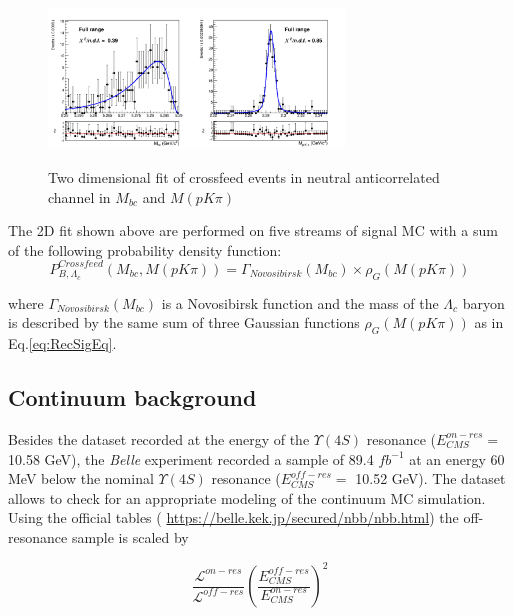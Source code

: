 \begin{figure}
\centering
{\includegraphics[width=0.7\textwidth]{04-SimultaneousFit/figs/stream12345_Crossfeed_neutral_anticorrLambdaC_2Dfit.png}}
\caption{Two dimensional fit of crossfeed events in neutral anticorrelated channel in $M_{bc}$  and $M(p K \pi)$ }
\label{fig:stream12345_Crossfeed_neutral_anticorrLambdaC_2Dfit}
\end{figure}

\newpage
The 2D fit shown above are  performed on five streams of signal MC with a sum of the following probability density function:
\vspace{0.2 cm}
 \begin{equation}
        P^{Crossfeed}_{B,\Lambda_c}(M_{bc}, M(p K \pi)) = \Gamma_{Novosibirsk}(M_{bc}) \times \rho_G(M(p K \pi))
\end{equation} 

where $\Gamma_{Novosibirsk}(M_{bc})$ is a Novosibirsk function and the mass of the $\Lambda_c$ baryon is described by the same sum of three Gaussian functions $\rho_G(M(p K \pi))$ as in Eq.\ref{eq:RecSigEq}.

\subsection{Continuum background}


 Besides the dataset recorded at the energy of the $\Upsilon(4S) $ resonance  ($E^{on-res}
_{CMS} = $ 10.58 GeV), the \textit{Belle} experiment recorded a sample of 89.4 $fb^{-1}$ at an energy 60 MeV below the nominal  $\Upsilon(4S) $ resonance ($E^{off-res}_{CMS} = $ 10.52 GeV). The dataset allows to check for an appropriate modeling of the continuum MC simulation. %
Using the official tables \newline ( \url{https://belle.kek.jp/secured/nbb/nbb.html}) the off-resonance sample is scaled by 

\begin{equation}
    \frac{\mathcal{L}^{on-res}}{\mathcal{L}^{off-res}} \left( \frac{E^{off-res}_{CMS}}{E^{on-res}_{CMS}}\right)^2
\label{eq:off-resScaling}
\end{equation}


